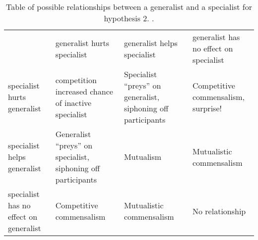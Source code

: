 
\begin{table}[t]
\small
  \begin{tabular}{*{4}{m{}}}
    \hline
    & generalist hurts \newline specialist & generalist helps \newline specialist & generalist has no \newline effect on specialist \\
    specialist hurts \newline generalist & \cellcolor{nullhypothesizedcell} competition \newline increased chance of inactive specialist & \cellcolor{hypothesizedcell} Specialist ``preys'' on generalist, siphoning off participants & \cellcolor{agnosticcell} Competitive \newline commensalism, \newline surprise!  \\
    specialist helps \newline  generalist & \cellcolor{nullhypothesizedcell} Generalist ``preys'' on specialist, siphoning off participants  & \cellcolor{hypothesizedcell} Mutualism & \cellcolor{agnosticcell} Mutualistic \newline commensalism \\
    specialist has no \newline effect on generalist & \cellcolor{nullhypothesizedcell} Competitive \newline commensalism &  \cellcolor{hypothesizedcell} Mutualistic \newline commensalism & \cellcolor{agnosticcell} No relationship \\ \hline
\end{tabular}
\caption{Table of possible relationships between a generalist and a specialist for hypothesis 2.    .}
\end{table}
